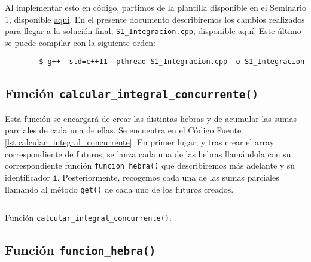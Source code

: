 \documentclass[12pt]{article}
\begin{document}
    Al implementar esto en código, partimos de la plantilla disponible en el Seminario 1, disponible \href{https://github.com/LosDelDGIIM/LosDelDGIIM.github.io/blob/main/subjects/SCD/Seminarios/Programas/S1_Integracion_Plantilla.cpp}{\color{blue}\ul{aquí}}.
    En el presente documento describiremos los cambios realizados para llegar a la solución final, \verb|S1_Integracion.cpp|, disponible \href{https://github.com/LosDelDGIIM/LosDelDGIIM.github.io/blob/main/subjects/SCD/Seminarios/Programas/S1_Integracion.cpp}{\color{blue}\ul{aquí}}.
    Este último se puede compilar con la siguiente orden:
    \begin{verbatim}
        $ g++ -std=c++11 -pthread S1_Integracion.cpp -o S1_Integracion
    \end{verbatim}

    
    \subsection{Función \texttt{calcular_integral_concurrente()}}

    Esta función se encargará de crear las distintas hebras y de acumular las sumas parciales de cada una de ellas. Se encuentra en el Código Fuente \ref{lst:calcular_integral_concurrente}.
    En primer lugar, y tras crear el array correspondiente de futuros, se lanza cada una de las hebras llamándola con su correspondiente función \texttt{funcion_hebra()} que describiremos más adelante y su identificador \verb|i|.
    Posteriormente, recogemos cada una de las sumas parciales llamando al método \texttt{get()} de cada uno de los futuros creados.
    \begin{listing}
        \inputminted[firstline=89, lastline=103]{c++}{./Programas/S1_Integracion.cpp}
        \caption{Función \texttt{calcular_integral_concurrente()}.}
        \label{lst:calcular_integral_concurrente}
    \end{listing}

    \subsection{Función \texttt{funcion_hebra()}}
\end{document}
